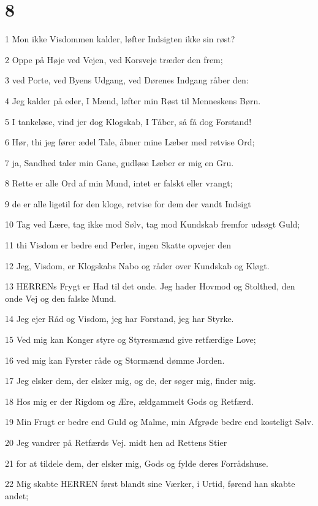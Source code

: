 \chapter{8}

\par 1 Mon ikke Visdommen kalder, løfter Indsigten ikke sin røst?
\par 2 Oppe på Høje ved Vejen, ved Korsveje træder den frem;
\par 3 ved Porte, ved Byens Udgang, ved Dørenes Indgang råber den:
\par 4 Jeg kalder på eder, I Mænd, løfter min Røst til Menneskens Børn.
\par 5 I tankeløse, vind jer dog Klogskab, I Tåber, så få dog Forstand!
\par 6 Hør, thi jeg fører ædel Tale, åbner mine Læber med retvise Ord;
\par 7 ja, Sandhed taler min Gane, gudløse Læber er mig en Gru.
\par 8 Rette er alle Ord af min Mund, intet er falskt eller vrangt;
\par 9 de er alle ligetil for den kloge, retvise for dem der vandt Indsigt
\par 10 Tag ved Lære, tag ikke mod Sølv, tag mod Kundskab fremfor udsøgt Guld;
\par 11 thi Visdom er bedre end Perler, ingen Skatte opvejer den
\par 12 Jeg, Visdom, er Klogskabs Nabo og råder over Kundskab og Kløgt.
\par 13 HERRENs Frygt er Had til det onde. Jeg hader Hovmod og Stolthed, den onde Vej og den falske Mund.
\par 14 Jeg ejer Råd og Visdom, jeg har Forstand, jeg har Styrke.
\par 15 Ved mig kan Konger styre og Styresmænd give retfærdige Love;
\par 16 ved mig kan Fyrster råde og Stormænd dømme Jorden.
\par 17 Jeg elsker dem, der elsker mig, og de, der søger mig, finder mig.
\par 18 Hos mig er der Rigdom og Ære, ældgammelt Gods og Retfærd.
\par 19 Min Frugt er bedre end Guld og Malme, min Afgrøde bedre end kosteligt Sølv.
\par 20 Jeg vandrer på Retfærds Vej. midt hen ad Rettens Stier
\par 21 for at tildele dem, der elsker mig, Gods og fylde deres Forrådshuse.
\par 22 Mig skabte HERREN først blandt sine Værker, i Urtid, førend han skabte andet;
